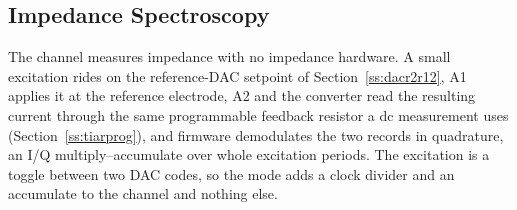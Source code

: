 %
%
%

\subsection{Impedance Spectroscopy}\label{ss:eis}

The channel measures impedance with no impedance hardware. A small excitation
rides on the reference-DAC setpoint of Section~\ref{ss:dacr2r12}, A1 applies it
at the reference electrode, A2 and the converter read the resulting current
through the same programmable feedback resistor a dc measurement uses
(Section~\ref{ss:tiarprog}), and firmware demodulates the two records in
quadrature, an I/Q multiply--accumulate over whole excitation
periods. The excitation is a toggle between two DAC codes, so the
mode adds a clock divider and an accumulate to the channel and nothing else.


